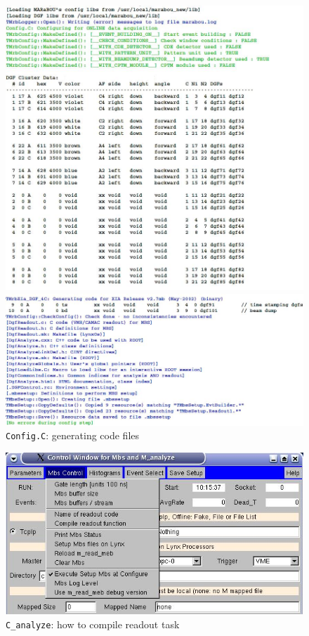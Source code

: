 \documentclass[10pt]{article}
\begin{document}
\begin{figure}[H]
\centerline{\includegraphics[width=\linewidth]{ConfigStep1}}
\centerline{\includegraphics[width=\linewidth]{ConfigStep2}}
\caption{\texttt{Config.C}: generating code files}
\label{ConfigStep}
\end{figure}

\begin{figure}[H]
\centerline{\includegraphics[width=\linewidth]{C_analyzeCompileReadout}}
\caption{\texttt{C\_analyze}: how to compile readout task}
\label{CanalyzeCompileReadout}
\end{figure}
\newpage
\end{document}
